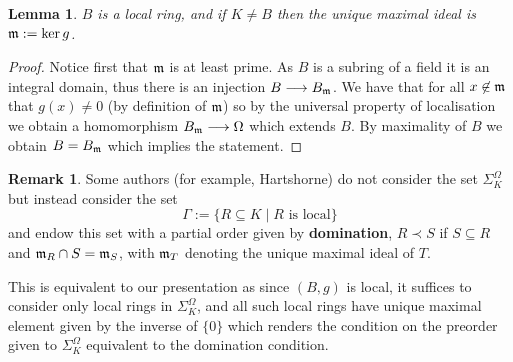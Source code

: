 \documentclass[12pt]{article}
\theoremstyle{plain}
\newtheorem{lemma}[thm]{Lemma}
\theoremstyle{definition}
\newtheorem{remark}[thm]{Remark}
\newcommand{\lto}{\longrightarrow}
\begin{document}
\begin{lemma}
\label{lem:local_kernel} $B$ is a local ring, and if $K \neq B$ then the unique maximal ideal is $\frak{m} := \ker g$.
\end{lemma}
\begin{proof}
Notice first that $\frak{m}$ is at least prime. As $B$ is a subring of a field it is an integral domain, thus there is an injection $B \lto B_\frak{m}$. We have that for all $x \not\in \frak{m}$ that $g(x) \neq 0$ (by definition of $\frak{m}$) so by the universal property of localisation we obtain a homomorphism $B_\frak{m} \lto \Omega$ which extends $B$. By maximality of $B$ we obtain $B = B_\frak{m}$ which implies the statement.
\end{proof}
\begin{remark}
Some authors (for example, Hartshorne) do not consider the set $\Sigma_K^\Omega$ but instead consider the set
\begin{equation}
\Gamma := \lbrace R \subseteq K \mid R\text{ is local}\rbrace
\end{equation}
and endow this set with a partial order given by \textbf{domination}, $R \prec S$ if $S \subseteq R$ and $\frak{m}_R \cap S = \frak{m}_S$, with $\frak{m}_T$ denoting the unique maximal ideal of $T$.

This is equivalent to our presentation as since $(B,g)$ is local, it suffices to consider only local rings in $\Sigma_K^\Omega$, and all such local rings have unique maximal element given by the inverse of $\lbrace 0 \rbrace$ which renders the condition on the preorder given to $\Sigma_K^\Omega$ equivalent to the domination condition.
\end{remark}
\end{document}
